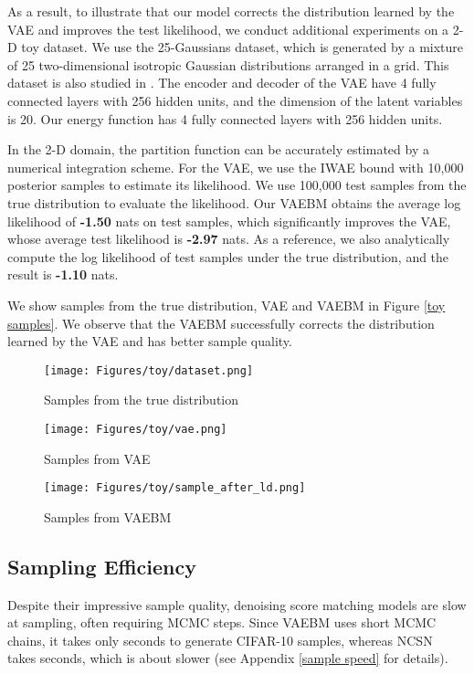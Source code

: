 \documentclass{article} \usepackage{iclr2021_conference,times}
\begin{document}
As a result, to illustrate that our model corrects the distribution learned by the VAE and improves the test likelihood, we conduct additional experiments on a 2-D toy dataset. We use the 25-Gaussians dataset, which is generated by a mixture of 25 two-dimensional isotropic
Gaussian distributions arranged in a grid.
This dataset is also studied in \citet{che2020your}. The encoder and decoder of the VAE have 4 fully connected layers with 256 hidden units, and the dimension of the latent variables is 20. Our energy function has 4 fully connected layers with 256 hidden units.

In the 2-D domain, the partition function  can be accurately estimated by a numerical integration scheme. For the VAE, we use the IWAE bound \citep{burda2015importance} with 10,000 posterior samples to estimate its likelihood. We use 100,000 test samples from the true distribution to evaluate the likelihood. Our VAEBM obtains the average log likelihood of \textbf{-1.50} nats on test samples, which significantly improves the VAE, whose average test likelihood is \textbf{-2.97} nats. As a reference, we also analytically compute the log likelihood of test samples under the true distribution, and the result is \textbf{-1.10} nats.

We show samples from the true distribution, VAE and VAEBM in Figure \ref{toy samples}. We observe that the VAEBM successfully corrects the distribution learned by the VAE and has better sample quality.

\begin{figure*}[ht]
    \centering
    \begin{subfigure}{.34\linewidth}
    \hspace{0.25cm}
    \texttt{[image: Figures/toy/dataset.png]}
    \caption{Samples from the true distribution}
    \end{subfigure}
    \begin{subfigure}{.3\linewidth}
    \texttt{[image: Figures/toy/vae.png]}
    \caption{Samples from VAE}
    \end{subfigure}
     \begin{subfigure}{.3\linewidth}
    \texttt{[image: Figures/toy/sample\_after\_ld.png]}
    \caption{Samples from VAEBM}
    \end{subfigure}
    \caption{\label{toy samples}
     Qualitative results on the 25-Gaussians dataset } \end{figure*}

\subsection{Sampling Efficiency}
Despite their impressive sample quality, denoising score matching models \citep{song2019generative,ho2020denoising} are slow at sampling, often requiring  MCMC steps. Since VAEBM uses short MCMC chains, it takes only  seconds to generate  CIFAR-10 samples, whereas NCSN~\citep{song2019generative} takes  seconds, which is about  slower (see Appendix \ref{sample speed} for details). 
\end{document}
